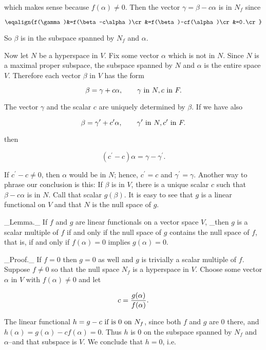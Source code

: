 which makes sense because \(f(\alpha)\neq 0\). Then the vector \(\gamma=\beta-c\alpha\) is in \(N_{f}\) since

\[\eqalign{f(\gamma)&=f(\beta-c\alpha)\cr&=f(\beta)-cf(\alpha)\cr&=0.\cr}\]

So \(\beta\) is in the subspace spanned by \(N_{f}\) and \(\alpha\).

Now let \(N\) be a hyperspace in \(V\). Fix some vector \(\alpha\) which is not in \(N\). Since \(N\) is a maximal proper subspace, the subspace spanned by \(N\) and \(\alpha\) is the entire space \(V\). Therefore each vector \(\beta\) in \(V\) has the form

\[\beta=\gamma+c\alpha,\qquad\gamma\hbox{ in }N,c\hbox{ in }F.\]

The vector \(\gamma\) and the scalar \(c\) are uniquely determined by \(\beta\). If we have also

\[\beta=\gamma^{\prime}+c^{\prime}\alpha,\qquad\gamma^{\prime}\hbox{ in }N,c^{\prime}\hbox{ in }F.\]

then

\[(c^{\prime}-c)\alpha=\gamma-\gamma^{\prime}.\]

If \(c^{\prime}-c\neq 0\), then \(\alpha\) would be in \(N\); hence, \(c^{\prime}=c\) and \(\gamma^{\prime}=\gamma\). Another way to phrase our conclusion is this: If \(\beta\) is in \(V\), there is a unique scalar \(c\) such that \(\beta-c\alpha\) is in \(N\). Call that scalar \(g(\beta)\). It is easy to see that \(g\) is a linear functional on \(V\) and that \(N\) is the null space of \(g\).

_Lemma._ If \(f\) and \(g\) are linear functionals on a vector space \(V\), _then \(g\) is a scalar multiple of \(f\) if and only if the null space of \(g\) contains the null space of \(f\), that is, if and only if \(f(\alpha)=0\) implies \(g(\alpha)=0\).

_Proof._ If \(f=0\) then \(g=0\) as well and \(g\) is trivially a scalar multiple of \(f\). Suppose \(f\neq 0\) so that the null space \(N_{f}\) is a hyperspace in \(V\). Choose some vector \(\alpha\) in \(V\) with \(f(\alpha)\neq 0\) and let

\[c={g(\alpha)\over f(\alpha)}.\]

The linear functional \(h=g-c\hbox{ if is }0\hbox{ on }N_{f}\), since both \(f\) and \(g\) are \(0\) there, and \(h(\alpha)=g(\alpha)-cf(\alpha)=0\). Thus \(h\) is \(0\) on the subspace spanned by \(N_{f}\) and \(\alpha\)--and that subspace is \(V\). We conclude that \(h=0\), i.e.

 